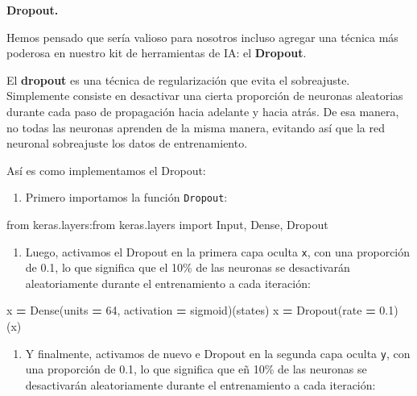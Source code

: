\documentclass[
]{book}
\newenvironment{Shaded}{\begin{snugshade}}{\end{snugshade}}
\newcommand{\DecValTok}[1]{\textcolor[rgb]{0.00,0.00,0.81}{#1}}
\newcommand{\FloatTok}[1]{\textcolor[rgb]{0.00,0.00,0.81}{#1}}
\newcommand{\ImportTok}[1]{#1}
\newcommand{\NormalTok}[1]{#1}
\newcommand{\OperatorTok}[1]{\textcolor[rgb]{0.81,0.36,0.00}{\textbf{#1}}}
\newcommand{\StringTok}[1]{\textcolor[rgb]{0.31,0.60,0.02}{#1}}
\providecommand{\tightlist}{%
  \setlength{\itemsep}{0pt}\setlength{\parskip}{0pt}}
\begin{document}
\textbf{Dropout.}

Hemos pensado que sería valioso para nosotros incluso agregar una técnica más poderosa en nuestro kit de herramientas de IA: el \textbf{Dropout}.

El \textbf{dropout} es una técnica de regularización que evita el sobreajuste. Simplemente consiste en desactivar una cierta proporción de neuronas aleatorias durante cada paso de propagación hacia adelante y hacia atrás. De esa manera, no todas las neuronas aprenden de la misma manera, evitando así que la red neuronal sobreajuste los datos de entrenamiento.

Así es como implementamos el Dropout:

\begin{enumerate}
\def\labelenumi{\arabic{enumi}.}
\tightlist
\item
  Primero importamos la función \texttt{Dropout}:
\end{enumerate}

\begin{Shaded}
\begin{Highlighting}[]
    \ImportTok{from}\NormalTok{ keras.layers:}\ImportTok{from}\NormalTok{ keras.layers }\ImportTok{import}\NormalTok{ Input, Dense, Dropout}
\end{Highlighting}
\end{Shaded}

\begin{enumerate}
\def\labelenumi{\arabic{enumi}.}
\setcounter{enumi}{1}
\tightlist
\item
  Luego, activamos el Dropout en la primera capa oculta \texttt{x}, con una proporción de 0.1, lo que significa que el 10\% de las neuronas se desactivarán aleatoriamente durante el entrenamiento a cada iteración:
\end{enumerate}

\begin{Shaded}
\begin{Highlighting}[]
\NormalTok{    x }\OperatorTok{=}\NormalTok{ Dense(units }\OperatorTok{=} \DecValTok{64}\NormalTok{, activation }\OperatorTok{=} \StringTok{\textquotesingle{}sigmoid\textquotesingle{}}\NormalTok{)(states)}
\NormalTok{    x }\OperatorTok{=}\NormalTok{ Dropout(rate }\OperatorTok{=} \FloatTok{0.1}\NormalTok{)(x)}
\end{Highlighting}
\end{Shaded}

\begin{enumerate}
\def\labelenumi{\arabic{enumi}.}
\setcounter{enumi}{2}
\tightlist
\item
  Y finalmente, activamos de nuevo e Dropout en la segunda capa oculta \texttt{y}, con una proporción de 0.1, lo que significa que eñ 10\% de las neuronas se desactivarán aleatoriamente durante el entrenamiento a cada iteración:
\end{enumerate}
\end{document}
